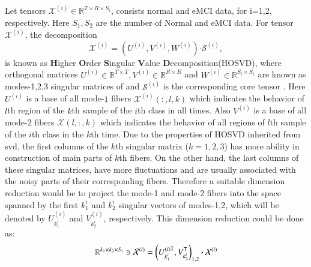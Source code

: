 \documentclass[preprint,12pt]{elsarticle}
\begin{document}
Let tensors $\mathcal{X}^{(i)}\in \mathbb{R}^{T\times R \times S_i}$, consists normal and eMCI data, for i=1,2, respectively.  Here $S_1,S_2$ are the number of Normal and eMCI data.
For tensor $\mathcal{X}^{(i)}$, the decomposition
\begin{equation}
\label{ho}
\mathcal{X}^{(i)} = 
\left(  
U^{(i)},V^{(i)},W^{(i)}
\right)\boldsymbol{\cdot} \mathcal{S}^{(i)},
\end{equation}
is known as \textbf{H}igher \textbf{O}rder \textbf{S}ingular \textbf{V}alue \textbf{D}ecomposition(HOSVD),
where orthogonal matrices $U^{(i)}\in \mathbb{R}^{T\times T}, V^{(i)}\in \mathbb{R}^{R\times R} $ and $W^{(i)}\in \mathbb{R}^{S_i\times S_i}$ are known as modes-1,2,3 singular matrices of 
and $\mathcal{S}^{(i)}$ is the corresponding core tensor \cite{r64}.  Here $U^{(i)}$ is a base of all mode-$ 1 $ fibers $\mathcal{X}^{(i)}(:,l,k)$
which indicates the behavior of $l$th region of the $k$th sample of the $i$th class in all times. Also  $V^{(i)}$ is a base of all mode-$ 2 $ fibers $\mathcal{X}(l,:,k)$ which indicates the behavior of all regions of  $l$th  sample of the $i$th class in  the $k$th time.
Due to the properties of HOSVD inherited from svd, the first columns of the $k$th singular matrix ($k = 1,2,3$) has more ability in construction of main parts of $k$th fibers. On the other hand, the last columns of  these singular matrices, have more fluctuations and are usually  associated  with the noisy parts of their corresponding fibers\cite{r64}. 
Therefore a suitable dimension reduction would be to project the mode-1 and mode-2 fibers into the space spanned by the first $k^i_1$ and $k^i_2$ singular vectors of modes-1,2, which will be denoted by $U^{(i)}_{k^i_1}$ and $V_{k^i_2}^{(i)}$, respectively. This dimension reduction could be done as:
\begin{align}
\label{m1}
\mathbb{R}^{k_1 \times k_2 \times S_i} \ni  \bar{{\mathcal{X}}}^{(i)} = \left( 
U^{(i) {\sf {T}}}_{k^i_1}, V_{k^i_2}^{\sf {T}}
\right)_{1,2}\boldsymbol{\cdot} \mathcal{X}^{(i)}
\end{align}
\end{document}

